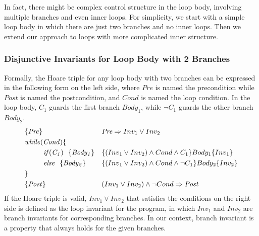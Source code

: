 In fact, there might be complex control structure in the loop body, involving multiple branches and even inner loops. 
For simplicity, we start with a simple loop body in which there are just two branches and no inner loops.
Then we extend our approach to loops with more complicated inner structure.

\subsubsection{Disjunctive Invariants for Loop Body with 2 Branches}
Formally, the Hoare triple for any loop body with two branches can be expressed in the following form on the left side, 
where $\mathit{Pre}$ is named the precondition while $\mathit{Post}$ is named the postcondition, and $\mathit{Cond}$ is named the loop condition.
In the loop body, $\mathit{C_1}$ guards the first branch $\mathit{Body_1}$, while $\mathit{\neg C_1}$ guards the other branch $\mathit{Body_2}$.
\begin{align}
&\{\mathit{Pre}\} && \emph{Pre} \Rightarrow \emph{$Inv_1$} \vee \emph{$Inv_2$} \label{sl1:ext:inv:pre}\\
&\mathit{while} (\mathit{Cond}) \{ && \\
&~~~~~~~~\mathit{if} (\mathit{C_1}) ~~\{ \mathit{Body_1} \} && \{(\emph{$Inv_1$} \vee \emph{$Inv_2$}) \wedge Cond \wedge C_1\} Body_1 \{\emph{$Inv_1$}\} \label{sl1:ext:inv:loop:b1}\\
&~~~~~~~~\mathit{else} ~~\{ \mathit{Body_2} \} && \{(\emph{$Inv_1$} \vee \emph{$Inv_2$}) \wedge Cond \wedge \neg C_1\} Body_2 \{\emph{$Inv_2$}\} \label{sl1:ext:inv:loop:b2}\\
&\} && \\
&\{\mathit{Post}\} && (\emph{$Inv_1$} \vee \emph{$Inv_2$}) \wedge \neg Cond \Rightarrow \emph{Post} \label{sl1:ext:inv:post}
\end{align}
If the Hoare triple is valid, $Inv_1 \vee Inv_2$ that satisfies the conditions on the right side is defined as the loop invariant for the program, 
in which $Inv_1$ and $Inv_2$ are branch invariants for corresponding branches.
In our context, branch invariant is a property that always holds for the given branches.

